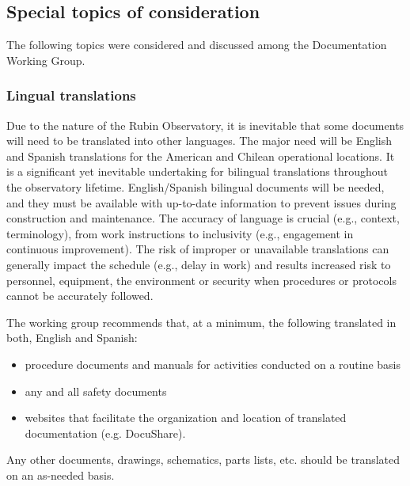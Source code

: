\subsection{Special topics of consideration}

The following topics were considered and discussed among the Documentation Working Group.

\subsubsection{Lingual translations}

Due to the nature of the Rubin Observatory, it is inevitable that some documents will need to be translated into other languages.
The major need will be English and Spanish translations for the American and Chilean operational locations.
It is a significant yet inevitable undertaking for bilingual translations throughout the observatory lifetime.
English/Spanish bilingual documents will be needed, and they must be available with up-to-date information to prevent issues during construction and maintenance.
The accuracy of language is crucial (e.g., context, terminology), from work instructions to inclusivity (e.g., engagement in continuous improvement).
The risk of improper or unavailable translations can generally impact the schedule (e.g., delay in work) and results increased risk to personnel, equipment, the environment or security when procedures or protocols cannot be accurately followed.

The working group recommends that, at a minimum, the following translated in both, English and Spanish:
\begin{itemize}
	\item procedure documents and manuals for activities conducted on a routine basis
	\item any and all safety documents
	\item websites that facilitate the organization and location of translated documentation (e.g. DocuShare).
\end{itemize}
Any other documents, drawings, schematics, parts lists, etc. should be translated on an as-needed basis.

